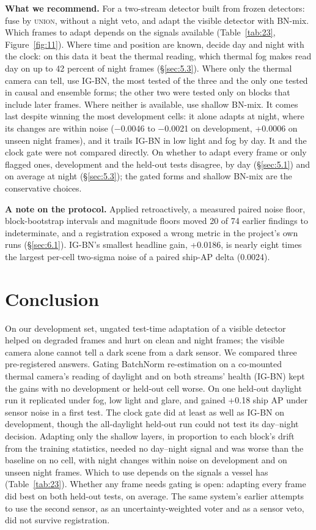\documentclass[10pt]{article}
\begin{document}
\textbf{What we recommend.} For a two-stream detector built from frozen detectors: fuse by \textsc{union}, without a night veto, and adapt the visible detector with BN-mix. Which frames to adapt depends on the signals available (Table~\ref{tab:23}, Figure~\ref{fig:11}). Where time and position are known, decide day and night with the clock: on this data it beat the thermal reading, which thermal fog makes read day on up to 42 percent of night frames (\S\ref{sec:5.3}). Where only the thermal camera can tell, use IG-BN, the most tested of the three and the only one tested in causal and ensemble forms; the other two were tested only on blocks that include later frames. Where neither is available, use shallow BN-mix. It comes last despite winning the most development cells: it alone adapts at night, where its changes are within noise ($-$0.0046 to $-$0.0021 on development, +0.0006 on unseen night frames), and it trails IG-BN in low light and fog by day. It and the clock gate were not compared directly. On whether to adapt every frame or only flagged ones, development and the held-out tests disagree, by day (\S\ref{sec:5.1}) and on average at night (\S\ref{sec:5.3}); the gated forms and shallow BN-mix are the conservative choices.

\textbf{A note on the protocol.} Applied retroactively, a measured paired noise floor, block-bootstrap intervals and magnitude floors moved 20 of 74 earlier findings to indeterminate, and a registration exposed a wrong metric in the project's own runs (\S\ref{sec:6.1}). IG-BN's smallest headline gain, +0.0186, is nearly eight times the largest per-cell two-sigma noise of a paired ship-AP delta (0.0024).

\section{Conclusion}\label{sec:8}
On our development set, ungated test-time adaptation of a visible detector helped on degraded frames and hurt on clean and night frames; the visible camera alone cannot tell a dark scene from a dark sensor. We compared three pre-registered answers. Gating BatchNorm re-estimation on a co-mounted thermal camera's reading of daylight and on both streams' health (IG-BN) kept the gains with no development or held-out cell worse. On one held-out daylight run it replicated under fog, low light and glare, and gained +0.18 ship AP under sensor noise in a first test. The clock gate did at least as well as IG-BN on development, though the all-daylight held-out run could not test its day--night decision. Adapting only the shallow layers, in proportion to each block's drift from the training statistics, needed no day--night signal and was worse than the baseline on no cell, with night changes within noise on development and on unseen night frames. Which to use depends on the signals a vessel has (Table~\ref{tab:23}). Whether any frame needs gating is open: adapting every frame did best on both held-out tests, on average. The same system's earlier attempts to use the second sensor, as an uncertainty-weighted voter and as a sensor veto, did not survive registration.
\end{document}
